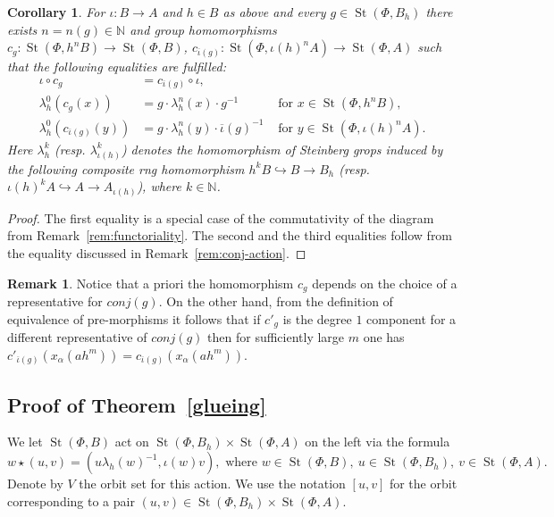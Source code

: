 \documentclass[oneside, 11pt]{amsart} \pdfoutput=1
\newcommand{\St}{\mathop{\mathrm{St}}\nolimits}
\numberwithin{equation}{section}
\newtheorem{corollary}[lemma]{Corollary}
\theoremstyle{definition}
\newtheorem{rem}[lemma]{Remark}
\begin{document}
\begin{corollary}
\label{vorcor}
For $\iota \colon B \to A$ and $h \in B$ as above and every $g \in \St(\Phi, B_h)$ there exists $n = n(g) \in \mathbb{N}$ 
and group homomorphisms $c_g \colon \St(\Phi, h^nB) \to \St(\Phi, B)$, $c_{\overline{\iota}(g)} \colon \St(\Phi, \iota(h)^nA) \to \St(\Phi, A)$
such that the following equalities are fulfilled:
\begin{align}
 \label{eq:coherence} \iota \circ c_g &= c_{\overline{\iota}(g)} \circ \iota, &\\
 \label{eq:strictB} \lambda_h^0 (c_g (x)) &= g \cdot \lambda_h^n(x) \cdot g^{-1}&\text{ for }x \in \St(\Phi, h^nB),\\
 \label{eq:strictA} \lambda_h^0 (c_{\overline{\iota}(g)}(y)) &= g \cdot \lambda_h^n(y) \cdot \overline{\iota}(g)^{-1}&\text{ for }y \in \St(\Phi, \iota(h)^nA).
\end{align}
Here $\lambda_h^k$ (resp. $\lambda^k_{\iota(h)}$) denotes the homomorphism of Steinberg grops induced by the following composite rng homomorphism $h^kB \hookrightarrow B \to B_h$ (resp. $\iota(h)^kA \hookrightarrow A \to A_{\iota(h)}$), where $k \in \mathbb{N}$.
\end{corollary}
\begin{proof}
 The first equality is a special case of the commutativity of the diagram from Remark~\ref{rem:functoriality}.
 The second and the third equalities follow from the equality discussed in Remark~\ref{rem:conj-action}.
\end{proof}
\begin{rem}\label{rem:indendepence}
 Notice that a priori the homomorphism $c_g$ depends on the choice of a representative for $conj(g)$. On the other hand, from the definition of equivalence of pre-morphisms it follows that if $c'_g$ is the degree $1$ component for a different representative of $conj(g)$ then for sufficiently large $m$ one has $c'_{\overline{\iota}(g)}(x_{\alpha}(ah^m)) = c_{\overline{\iota}(g)}(x_{\alpha}(ah^m))$.
\end{rem}

\subsection{Proof of Theorem~\ref{glueing}} \label{sec:proof-glueing}
We let $\St(\Phi, B)$ act on $\St(\Phi, B_h) \times \St(\Phi, A)$ on the left via the formula 
\[w \star (u, v) = (u \lambda_h(w)^{-1}, \iota(w) v),\text{ where }w \in \St(\Phi, B),\ u \in \St(\Phi, B_h),\ v \in \St(\Phi, A).\]
Denote by $V$ the orbit set for this action. We use the notation $[u, v]$ for the orbit corresponding to a pair $(u, v) \in \St(\Phi, B_h) \times \St(\Phi, A)$.
\end{document}
